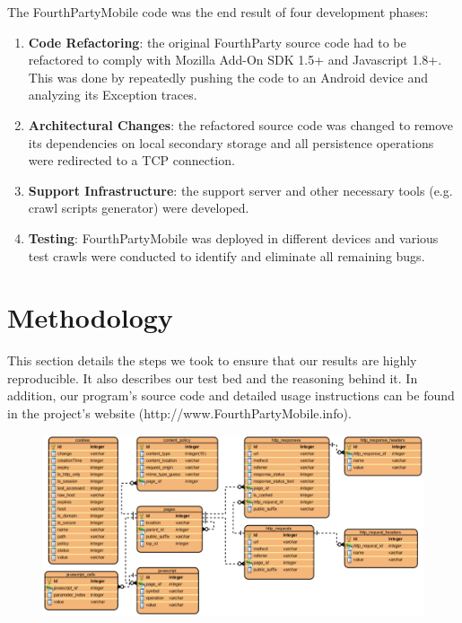 \documentclass{acm_proc_article-sp}
\begin{document}
The FourthPartyMobile code was the end result of four development phases:

\begin{enumerate}
\item \textbf{Code Refactoring}: the original FourthParty source code had to be refactored to comply with Mozilla Add-On SDK 1.5+ and Javascript 1.8+. This was done by repeatedly pushing the code to an Android device and analyzing its Exception traces.

\item \textbf{Architectural Changes}: the refactored source code was changed to remove its dependencies on local secondary storage and all persistence operations were redirected to a TCP connection.

\item \textbf{Support Infrastructure}: the support server and other necessary tools (e.g. crawl scripts generator) were developed.

\item \textbf{Testing}: FourthPartyMobile was deployed in different devices and various test crawls were conducted to identify and eliminate all remaining bugs.

\end{enumerate}

\section{Methodology}
This section details the steps we took to ensure that our results are highly reproducible. It also describes our test bed and the reasoning behind it. In addition, our program's source code and detailed usage instructions can be found in the project's website (http://www.FourthPartyMobile.info).


\begin{figure}[ht] 
\centering \includegraphics[scale=0.70]{diagrams/db_diagram.png}
\label{fig:db_schema}
\end{figure}
\end{document}
